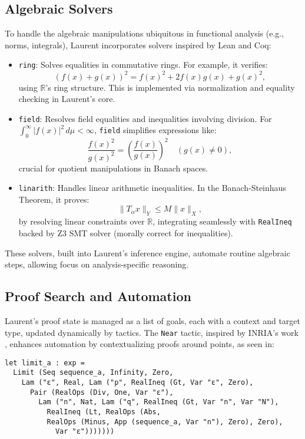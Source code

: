 \documentclass[12pt,twoside,draft]{cmpart}
\begin{document}
\subsection{Algebraic Solvers}
To handle the algebraic manipulations ubiquitous in functional analysis (e.g., norms, integrals), Laurent incorporates solvers inspired by Lean and Coq:
\begin{itemize}
\item \texttt{ring}: Solves equalities in commutative rings. For example, it verifies:
\[
(f(x) + g(x))^2 = f(x)^2 + 2 f(x) g(x) + g(x)^2,
\]
using $\mathbb{R}$’s ring structure. This is implemented via normalization and equality checking in Laurent’s core.
\item \texttt{field}: Resolves field equalities and inequalities involving division. For $\int_0^\infty |f(x)|^2 \, d\mu < \infty$, \texttt{field} simplifies expressions like:
\[
\frac{f(x)^2}{g(x)^2} = \left( \frac{f(x)}{g(x)} \right)^2 \quad (g(x) \neq 0),
\]
crucial for quotient manipulations in Banach spaces.

\item \texttt{linarith}: Handles linear arithmetic inequalities. In the Banach-Steinhaus Theorem, it proves:
\[
\| T_\alpha x \|_Y \leq M \| x \|_X,
\]
by resolving linear constraints over $\mathbb{R}$, integrating seamlessly with \texttt{RealIneq} backed by Z3 SMT solver (morally correct for inequalities).
\end{itemize}
These solvers, built into Laurent’s inference engine, automate routine algebraic steps, allowing focus on analysis-specific reasoning.

\subsection{Proof Search and Automation}
Laurent’s proof state is managed as a list of goals, each with a context
and target type, updated dynamically by tactics. The \texttt{Near} tactic,
inspired by INRIA’s work \cite{af18}, enhances automation by contextualizing
proofs around points, as seen in:

\begin{verbatim}
let limit_a : exp =
  Limit (Seq sequence_a, Infinity, Zero,
    Lam ("ε", Real, Lam ("p", RealIneq (Gt, Var "ε", Zero),
      Pair (RealOps (Div, One, Var "ε"),
        Lam ("n", Nat, Lam ("q", RealIneq (Gt, Var "n", Var "N"),
          RealIneq (Lt, RealOps (Abs,
          RealOps (Minus, App (sequence_a, Var "n"), Zero), Zero),
            Var "ε")))))))
\end{verbatim}
\end{document}
